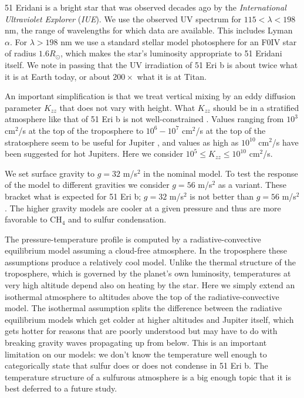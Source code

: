 \documentclass[preprint]{aastex6}
\begin{document}
51 Eridani is a bright star that was observed decades ago by the {\it International Ultraviolet Explorer} ({\it IUE}).
We use the observed {UV} spectrum for $115 < \lambda < 198$ nm, the range of wavelengths
 for which data are available.   
 {\color{red} This includes Lyman $\alpha$.} 
For $\lambda > 198$ nm we use a standard stellar model photosphere for an F0IV star of
 radius $1.6 R_{\odot}$, which makes the star's luminosity appropriate to 51 Eridani itself.
We note in passing that the {UV} irradiation of 51 Eri b is about twice what it is at Earth today,
or about $200\times$ what it is at Titan.  

An important simplification is that we treat vertical mixing by an eddy diffusion parameter $K_{zz}$ that does
not vary with height.
What $K_{zz}$ should be in a stratified atmosphere like that of 51 Eri b is not well-constrained \citep{Freytag2010}. 
Values ranging from $10^3$ cm$^2$/s at the top of the troposphere to $10^6-10^7$ cm$^2$/s at the top of the stratosphere seem to be useful for Jupiter \citep{Moses2005}, and values as high as $10^{10} $ cm$^2$/s have been suggested for hot Jupiters.
Here we consider $10^{5} \leq K_{zz} \leq 10^{10} $ cm$^2$/s.

We set surface gravity to $g=32$ m/s$^2$ in the nominal model.
To test the response of the model to different gravities we consider $g=56$ m/s$^2$ as a variant.
These bracket what is expected for 51 Eri b; $g=32$ m/s$^2$ is not better than $g=56$ m/s$^2$.
The higher gravity models are cooler at a given pressure and thus are more favorable to CH$_4$ and to sulfur condensation.

 The pressure-temperature profile is computed by a radiative-convective equilibrium model assuming a cloud-free atmosphere.
 In the troposphere these assumptions produce a relatively cool model.
 Unlike the thermal structure of the troposphere, which is governed by the planet's own luminosity,
 temperatures at very high altitude depend also on heating by the star.    
 Here we simply extend an isothermal atmosphere to altitudes above the top of the radiative-convective model.
 {\color{red} The isothermal assumption splits the difference between the radiative equilibrium models which get colder at higher
 altitudes and Jupiter itself, which gets hotter for reasons that are poorly understood but may have to do with breaking gravity
 waves propagating up from below. }
 This is an important limitation on our models: we don't know the temperature well enough to categorically state
 that sulfur does or does not condense in 51 Eri b.
 The temperature structure of a sulfurous atmosphere is a big enough topic that it is best  
 deferred to a future study.   
\end{document}
